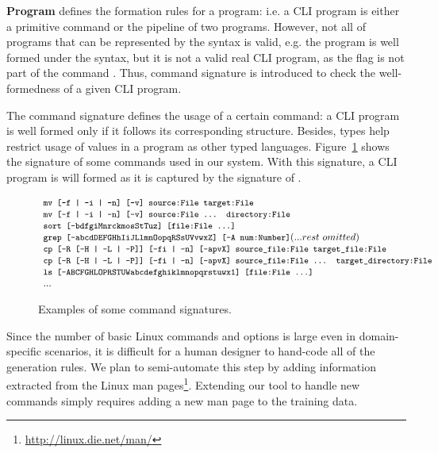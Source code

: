 \textbf{Program} defines the formation rules for a program: i.e. a CLI program is either a primitive command or the pipeline of two programs. However, not all of programs that can be represented by the syntax is valid, e.g. the program  is well formed under the syntax, but it is not a valid real CLI program, as the  flag is not part of the command . Thus, command signature is introduced to check the well-formedness of a given CLI program. 

The command signature defines the usage of a certain command: a CLI program is well formed only if it follows its corresponding structure. Besides, types help restrict usage of values in a program as other typed languages. Figure~\ref{fig:cmdsig} shows the signature of some commands used in our system. With this signature, a CLI program  is will formed as it is captured by the signature of .

\begin{figure}[ht]
\[
\begin{array}{l}

\code{mv [-f | -i | -n] [-v] source:File target:File}\\
\code{mv [-f | -i | -n] [-v] source:File ... directory:File}\\
\code{sort [-bdfgiMnrckmosStTuz] [file:File ...]}\\
\code{grep [-abcdDEFGHhIiJLlmnOopqRSsUVvwxZ] [-A num:Number]} (... rest~omitted)\\
\code{cp [-R [-H | -L | -P]] [-fi | -n] [-apvX] source\_file:File target\_file:File}\\
\code{cp [-R [-H | -L | -P]] [-fi | -n] [-apvX] source\_file:File ... target\_directory:File}\\
\code{ls [-ABCFGHLOPRSTUW\@abcdefghiklmnopqrstuwx1] [file:File ...]}\\
...
\end{array}
\]
\vspace{-15pt}
\caption{Examples of some command signatures.}
\label{fig:cmdsig}
\end{figure}

Since the number of basic Linux commands and options is large even in domain-specific scenarios, it is difficult for a human designer to hand-code all of the generation rules. We plan to semi-automate this step by adding information extracted from the Linux man pages\footnote{\url{http://linux.die.net/man/}}. Extending our tool to handle new commands simply requires adding a new man page to the training data.


